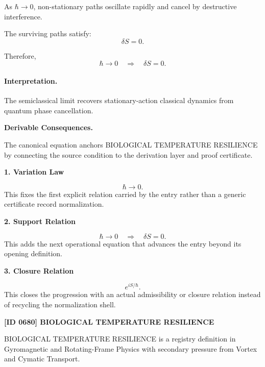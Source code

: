 As $\hbar\to 0$, non-stationary paths oscillate rapidly and cancel by destructive interference.

The surviving paths satisfy:
\begin{equation}
\delta S=0 .
\end{equation}

Therefore,
\begin{equation}
\boxed{
\hbar\rightarrow 0
\quad\Longrightarrow\quad
\delta S=0 .
}
\end{equation}

\paragraph{Interpretation.}
The semiclassical limit recovers stationary-action classical dynamics from quantum phase cancellation.

\par\vspace{0.35em}
\noindent\textbf{Derivable Consequences.}\quad
\begingroup
\footnotesize
\raggedright
The canonical equation anchors BIOLOGICAL TEMPERATURE RESILIENCE by connecting the source condition to the derivation layer and proof certificate.
\par\endgroup

\noindent\textbf{1. Variation Law}\par
\[
\hbar\rightarrow 0.
\]
\noindent This fixes the first explicit relation carried by the entry rather than a generic certificate record normalization.\par
\noindent\textbf{2. Support Relation}\par
\[
\hbar\rightarrow 0 \quad\Longrightarrow\quad \delta S=0.
\]
\noindent This adds the next operational equation that advances the entry beyond its opening definition.\par
\noindent\textbf{3. Closure Relation}\par
\[
e^{iS/\hbar}.
\]
\noindent This closes the progression with an actual admissibility or closure relation instead of recycling the normalization shell.\par

\clearpage
\noindent\textbf{[ID 0680] BIOLOGICAL TEMPERATURE RESILIENCE}\par
\vspace{0.35em}
\begingroup\small
{}
BIOLOGICAL TEMPERATURE RESILIENCE is a registry definition in Gyromagnetic and Rotating-Frame Physics with secondary pressure from Vortex and Cymatic Transport.

